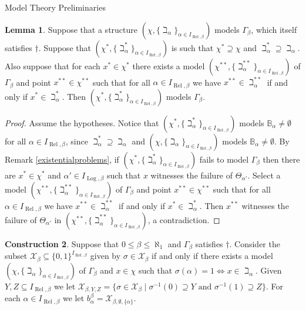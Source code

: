 \documentclass{amsart}
\theoremstyle{definition}\newtheorem{theorem}{Theorem}
\theoremstyle{definition}\newtheorem{bigtheorem}{Theorem}
\numberwithin{theorem}{section}
\theoremstyle{definition}\newtheorem{corollary}[theorem]{Corollary}
\theoremstyle{definition}\newtheorem{proposition}[theorem]{Proposition}
\theoremstyle{definition}\newtheorem{definition}[theorem]{Definition}
\theoremstyle{definition}\newtheorem{question}[theorem]{Question}
\theoremstyle{definition}\newtheorem{example}[theorem]{Example}
\theoremstyle{definition}\newtheorem{remark}[theorem]{Remark}
\theoremstyle{definition}\newtheorem{note}[theorem]{Note}
\theoremstyle{definition}\newtheorem{lemma}[theorem]{Lemma}
\theoremstyle{definition}\newtheorem{fact}[theorem]{Fact}
\theoremstyle{definition}\newtheorem{define}[theorem]{Definition}
\theoremstyle{definition}\newtheorem{definitions}[theorem]{Definitions}
\theoremstyle{definition}\newtheorem{claim}[theorem]{Claim}
\theoremstyle{definition}\newtheorem{obs}[theorem]{Observation}
\theoremstyle{definition}\newtheorem{construction}[theorem]{Construction}
\newcommand{\B}{\mathbb{B}}
\newcommand{\Rel}{\operatorname{Rel}}
\newcommand{\Log}{\operatorname{Log}}
\newcommand{\X}{\mathcal{X}}
\begin{document}
\begin{section}{Model Theory Preliminaries}
\begin{lemma}\label{addingpoints}  Suppose that a structure $(\chi, \{\beth_{\alpha}\}_{\alpha \in I_{\Rel, \beta}})$ models $\Gamma_{\beta}$, which itself satisfies $\dagger$.  Suppose that $(\chi^*, \{\beth_{\alpha}^*\}_{\alpha \in I_{\Rel, \beta}})$ is such that $\chi^* \supseteq \chi$ and $\beth_{\alpha}^* \supseteq \beth_{\alpha}$.  Also suppose that for each $x^* \in \chi^*$ there exists a model $(\chi^{**}, \{\beth_{\alpha}^{**}\}_{\alpha \in I_{\Rel, \beta}})$ of $\Gamma_{\beta}$ and point $x^{**}\in \chi^{**}$ such that for all $\alpha \in I_{\Rel, \beta}$ we have $x^{**} \in \beth_{\alpha}^{**}$ if and only if $x^* \in \beth_{\alpha}^*$.  Then $(\chi^*, \{\beth_{\alpha}^*\}_{\alpha \in I_{\Rel, \beta}})$ models $\Gamma_{\beta}$.
\end{lemma}

\begin{proof}  Assume the hypotheses.  Notice that $(\chi^*, \{\beth_{\alpha}^*\}_{\alpha \in I_{\Rel, \beta}})$ models $\B_{\alpha} \neq \emptyset$ for all $\alpha \in I_{\Rel, \beta}$, since $\beth_{\alpha}^* \supseteq \beth_{\alpha}$ and $(\chi, \{\beth_{\alpha}\}_{\alpha \in I_{\Rel, \beta}})$ models $\B_{\alpha}\neq \emptyset$.  By Remark \ref{existentialproblems}, if $(\chi^*, \{\beth_{\alpha}^*\}_{\alpha \in I_{\Rel, \beta}})$ fails to model $\Gamma_{\beta}$ then there are $x^* \in \chi^*$ and $\alpha' \in I_{\Log, \beta}$ such that $x$ witnesses the failure of $\Theta_{\alpha'}$.  Select a model  $(\chi^{**}, \{\beth_{\alpha}^{**}\}_{\alpha \in I_{\Rel,\beta}})$ of $\Gamma_{\beta}$ and point $x^{**}\in \chi^{**}$ such that for all $\alpha \in I_{\Rel, \beta}$ we have $x^{**} \in \beth_{\alpha}^{**}$ if and only if $x^* \in \beth_{\alpha}^*$.  Then $x^{**}$ witnesses the failure of $\Theta_{\alpha'}$ in $(\chi^{**}, \{\beth_{\alpha}^{**}\}_{\alpha \in I_{\Rel, \beta}})$, a contradiction.
\end{proof}

\begin{construction}  Suppose that $0 \leq \beta \leq \aleph_1$ and $\Gamma_{\beta}$ satisfies $\dagger$.  Consider the subset $\X_{\beta} \subseteq \{0, 1\}^{I_{\Rel, \beta}}$ given by $\sigma \in \X_{\beta}$ if and only if there exists a model $(\chi, \{\beth_{\alpha}\}_{\alpha \in I_{\Rel, \beta}})$ of $\Gamma_{\beta}$ and $x\in \chi$ such that $\sigma(\alpha) = 1 \Leftrightarrow x \in\beth_{\alpha}$.  Given $Y, Z \subseteq I_{\Rel, \beta}$ we let $\X_{\beta, Y, Z} = \{\sigma\in \X_{\beta} \mid \sigma^{-1}(0) \supseteq Y \text{ and }\sigma^{-1}(1) \supseteq Z \}$.  For each $\alpha \in I_{\Rel, \beta}$ we let $b_{\alpha}^{\beta} =  \X_{\beta, \emptyset, \{\alpha\}}$.
\end{construction}


\end{section}
\end{document}
